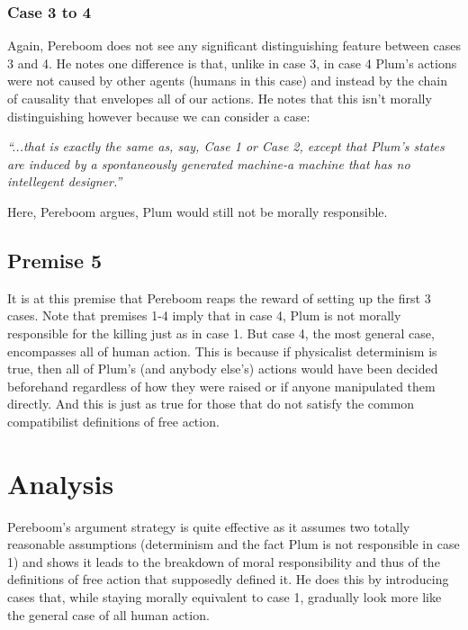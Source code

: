 \documentclass{article}
\begin{document}
\subsubsection{Case 3 to 4}
Again, Pereboom does not see any significant distinguishing feature between cases 3 and 4. He notes one difference is that, unlike in case 3, in case 4 Plum's actions were not caused by other agents (humans in this case) and instead by the chain of causality that envelopes all of our actions. He notes that this isn't morally distinguishing however because we can consider a case:
\begin{displayquote}
  \textit{``...that is exactly the same as, say, Case 1 or Case 2, except that Plum's states are induced by a spontaneously generated machine-a machine that has no intellegent designer.''}
\end{displayquote}

\noindent Here, Pereboom argues, Plum would still not be morally responsible.

\subsection{Premise 5}
It is at this premise that Pereboom reaps the reward of setting up the first 3 cases. Note that premises 1-4 imply that in case 4, Plum is not morally responsible for the killing just as in case 1. But case 4, the most general case, encompasses all of human action. This is because if physicalist determinism is true, then all of Plum's (and anybody else's) actions would have been decided beforehand regardless of how they were raised or if anyone manipulated them directly. And this is just as true for those that do not satisfy the common compatibilist definitions of free action.


\section{Analysis}
Pereboom's argument strategy is quite effective as it assumes two totally reasonable assumptions (determinism and the fact Plum is not responsible in case 1) and shows it leads to the breakdown of moral responsibility and thus of the definitions of free action that supposedly defined it. He does this by introducing cases that, while staying morally equivalent to case 1, gradually look more like the general case of all human action.
\end{document}
